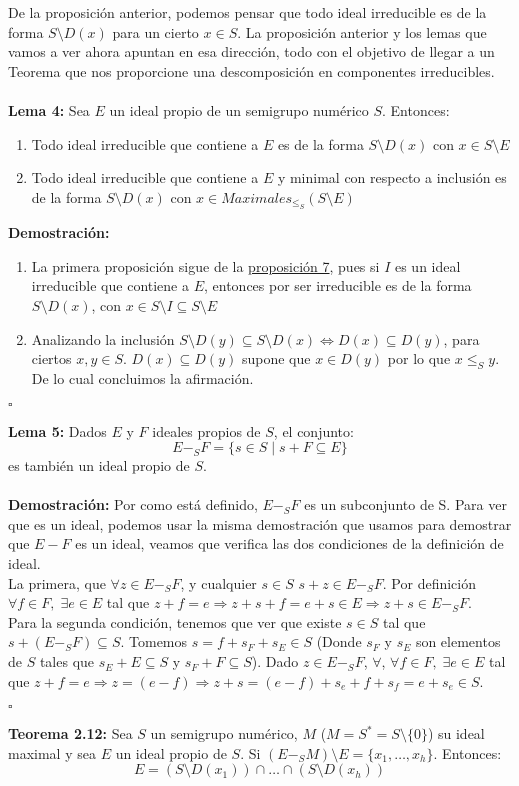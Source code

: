 \documentclass[11pt,spanish]{book}
\newcommand{\qed}{\begin{flushright} $\square$ \end{flushright}}
\begin{document}
De la proposición anterior, podemos pensar que todo ideal irreducible es de la forma $S\setminus D(x)$ para un cierto $x\in S$. La proposición anterior y los lemas que vamos a ver ahora apuntan en esa dirección, todo con el objetivo de llegar a un Teorema que nos proporcione una descomposición en componentes irreducibles.\\
\\ \hypertarget{lema4}{\textbf{Lema 4: }} Sea $E$ un ideal propio de un semigrupo numérico $S$. Entonces:
\begin{enumerate}
    \item Todo ideal irreducible que contiene a $E$ es de la forma $S\setminus D(x)$ con $x\in S\setminus E$
    \item Todo ideal irreducible que contiene a $E$ y minimal con respecto a inclusión es de la forma $S\setminus D(x)$ con $x\in Maximales_{\leq_{S}}(S\setminus E)$ 
\end{enumerate}
\textbf{Demostración: } 
\begin{enumerate}
    \item La primera proposición sigue de la \hyperlink{prop7}{proposición 7}, pues si $I$ es un ideal irreducible que contiene a $E$, entonces por ser irreducible es de la forma $S\setminus D(x)$, con $x\in S\setminus I\subseteq S \setminus  E$
    \item Analizando la inclusión $S\setminus D(y) \subseteq S\setminus D(x)\Longleftrightarrow D(x)\subseteq D(y)$, para ciertos $x,y\in S$. $D(x)\subseteq D(y)$ supone que  $x\in D(y)$ por lo que $x\leq_{S} y$. De lo cual concluimos la afirmación.
\end{enumerate}
\qed
\textbf{Lema 5: } Dados $E$ y $F$ ideales propios de $S$, el conjunto:
$$E-_{S}F=\{s\in S\;|\; s+F\subseteq E\}$$
es también un ideal propio de $S$.\\ \\ 
\textbf{Demostración:}
Por como está definido, $E-_{S}F$ es un subconjunto de S. Para ver que es un ideal, podemos usar la misma demostración que usamos para demostrar que $E-F$ es un ideal, veamos que verifica las dos condiciones de la definición de ideal.\\

La primera, que  $\forall z\in E-_{S} F$, y cualquier $s\in S$ $s+z\in E-_{S} F$. Por definición $\forall f\in F,\;\exists e\in E$ tal que $z+f=e\Rightarrow z+s+f=e+s\in E\Rightarrow z+s\in E-_{S}F$.\\

Para la segunda condición, tenemos que ver que existe $s\in S$ tal que $s+(E-_{S}F)\subseteq S$. Tomemos $s=f+s_{F}+s_{E}\in S$ (Donde $s_{F}$ y $s_{E}$ son elementos de $S$ tales que $s_{E}+E\subseteq S$ y $s_{F}+F\subseteq S$). Dado $z\in E-_{S}F$, $\forall$, $\forall f\in F,\;\exists e\in E$ tal que $z+f=e\Rightarrow z=(e-f)\Rightarrow z+s = (e-f)+s_{e}+f+s_{f}=e+s_{e}\in S$.
\qed
\textbf{Teorema 2.12:} Sea $S$ un semigrupo numérico, $M$ ($M=S^{*}=S\setminus \{0\}$) su ideal maximal y sea $E$ un ideal propio de $S$. Si $(E-_{S}M)\setminus E = \{x_{1},\ldots,x_{h}\}$. Entonces:
$$E= (S\setminus D(x_{1}))\cap\ldots\cap(S\setminus D(x_{h}))$$\\
\end{document}

